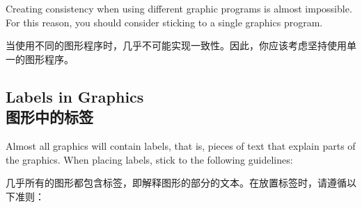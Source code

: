 Creating consistency when using different graphic programs is almost
impossible. For this reason, you should consider sticking to a single graphics
program.

当使用不同的图形程序时，几乎不可能实现一致性。因此，你应该考虑坚持使用单一的图形程序。

\subsection{Labels in Graphics\\图形中的标签}

Almost all graphics will contain labels, that is, pieces of text that explain
parts of the graphics. When placing labels, stick to the following guidelines:

几乎所有的图形都包含标签，即解释图形的部分的文本。在放置标签时，请遵循以下准则：
%
